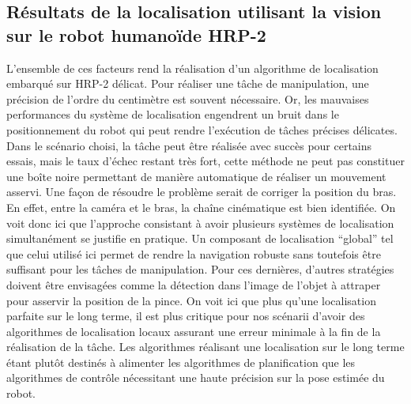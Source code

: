 \subsection{Résultats de la localisation utilisant la vision sur le robot humanoïde HRP-2}

L'ensemble de ces facteurs rend la réalisation d'un algorithme de
localisation embarqué sur HRP-2 délicat. Pour réaliser
une tâche de manipulation, une précision de l'ordre du centimètre est
souvent nécessaire. Or, les mauvaises performances du système de
localisation engendrent un bruit dans le positionnement du robot qui
peut rendre l'exécution de tâches précises délicates. Dans le scénario
choisi, la tâche peut être réalisée avec succès pour certains essais,
mais le taux d'échec restant très fort, cette méthode ne peut pas
constituer une boîte noire permettant de manière automatique de
réaliser un mouvement asservi. Une façon de résoudre le problème
serait de corriger la position du bras. En effet, entre la caméra et
le bras, la chaîne cinématique est bien identifiée. On voit donc ici
que l'approche consistant à avoir plusieurs systèmes de localisation
simultanément se justifie en pratique. Un composant de localisation
``global'' tel que celui utilisé ici permet de rendre la navigation
robuste sans toutefois être suffisant pour les tâches de
manipulation. Pour ces dernières, d'autres stratégies doivent être
envisagées comme la détection dans l'image de l'objet à attraper pour
asservir la position de la pince. On voit ici que plus qu'une
localisation parfaite sur le long terme, il est plus critique pour nos
scénarii d'avoir des algorithmes de localisation locaux assurant une
erreur minimale à la fin de la réalisation de la tâche. Les
algorithmes réalisant une localisation sur le long terme étant plutôt
destinés à alimenter les algorithmes de planification que les
algorithmes de contrôle nécessitant une haute précision sur la pose
estimée du robot.




